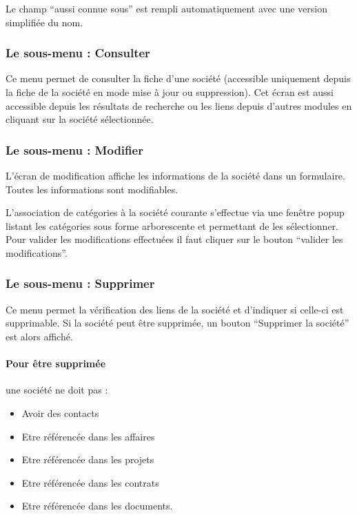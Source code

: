 Le champ ``aussi connue sous'' est rempli automatiquement avec une version simplifiée du nom.

\subsubsection{Le sous-menu : Consulter}

Ce menu permet de consulter la fiche d'une société (accessible uniquement depuis la fiche de la société en mode mise à jour ou suppression).
Cet écran est aussi accessible depuis les résultats de recherche ou les liens depuis d'autres modules en cliquant sur la société sélectionnée.

\subsubsection{Le sous-menu : Modifier}

L'écran de modification affiche les informations de la société dans un formulaire.
Toutes les informations sont modifiables.

L'association de catégories à la société courante s'effectue via une fenêtre popup listant les catégories sous forme arborescente et permettant de les sélectionner.\\

Pour valider les modifications effectuées il faut cliquer sur le bouton ``valider les modifications''.


\subsubsection{Le sous-menu : Supprimer}
Ce menu permet la vérification des liens de la société et d'indiquer si celle-ci est supprimable.
Si la société peut être supprimée, un bouton ``Supprimer la société'' est alors affiché.

\paragraph{Pour être supprimée} une société ne doit pas :\\

\begin{itemize}
\item Avoir des contacts
\item Etre référencée dans les affaires
\item Etre référencée dans les projets
\item Etre référencée dans les contrats
\item Etre référencée dans les documents.
\end{itemize}


